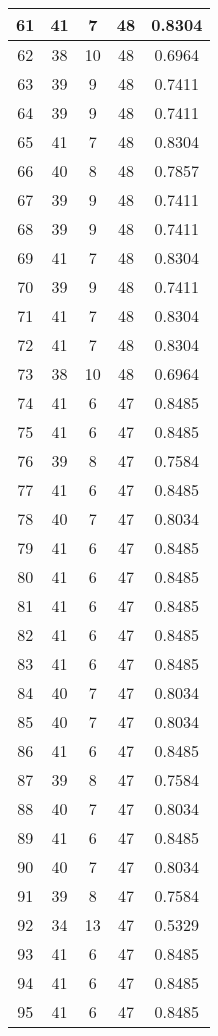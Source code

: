 \documentclass[letterpaper, 12pt]{article}
\begin{document}
\begin{longtable}{|c|c|c|c|c|}
61 & 41 & 7 & 48 & 0.8304 \\
\hline
62 & 38 & 10 & 48 & 0.6964 \\
\hline
63 & 39 & 9 & 48 & 0.7411 \\
\hline
64 & 39 & 9 & 48 & 0.7411 \\
\hline
65 & 41 & 7 & 48 & 0.8304 \\
\hline
66 & 40 & 8 & 48 & 0.7857 \\
\hline
67 & 39 & 9 & 48 & 0.7411 \\
\hline
68 & 39 & 9 & 48 & 0.7411 \\
\hline
69 & 41 & 7 & 48 & 0.8304 \\
\hline
70 & 39 & 9 & 48 & 0.7411 \\
\hline
71 & 41 & 7 & 48 & 0.8304 \\
\hline
72 & 41 & 7 & 48 & 0.8304 \\
\hline
73 & 38 & 10 & 48 & 0.6964 \\
\hline
74 & 41 & 6 & 47 & 0.8485 \\
\hline
75 & 41 & 6 & 47 & 0.8485 \\
\hline
76 & 39 & 8 & 47 & 0.7584 \\
\hline
77 & 41 & 6 & 47 & 0.8485 \\
\hline
78 & 40 & 7 & 47 & 0.8034 \\
\hline
79 & 41 & 6 & 47 & 0.8485 \\
\hline
80 & 41 & 6 & 47 & 0.8485 \\
\hline
81 & 41 & 6 & 47 & 0.8485 \\
\hline
82 & 41 & 6 & 47 & 0.8485 \\
\hline
83 & 41 & 6 & 47 & 0.8485 \\
\hline
84 & 40 & 7 & 47 & 0.8034 \\
\hline
85 & 40 & 7 & 47 & 0.8034 \\
\hline
86 & 41 & 6 & 47 & 0.8485 \\
\hline
87 & 39 & 8 & 47 & 0.7584 \\
\hline
88 & 40 & 7 & 47 & 0.8034 \\
\hline
89 & 41 & 6 & 47 & 0.8485 \\
\hline
90 & 40 & 7 & 47 & 0.8034 \\
\hline
91 & 39 & 8 & 47 & 0.7584 \\
\hline
92 & 34 & 13 & 47 & 0.5329 \\
\hline
93 & 41 & 6 & 47 & 0.8485 \\
\hline
94 & 41 & 6 & 47 & 0.8485 \\
\hline
95 & 41 & 6 & 47 & 0.8485 \\

\end{longtable}
\end{document}
